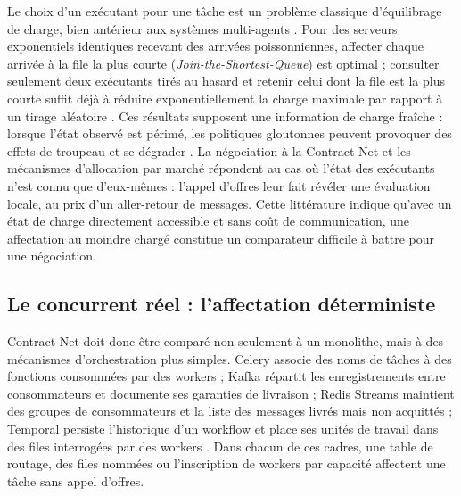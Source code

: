 Le choix d'un exécutant pour une tâche est un problème classique d'équilibrage de charge, bien antérieur aux systèmes multi-agents \cite{jiang2016survey}. Pour des serveurs exponentiels identiques recevant des arrivées poissonniennes, affecter chaque arrivée à la file la plus courte (\textit{Join-the-Shortest-Queue}) est optimal \cite{winston1977shortest} ; consulter seulement deux exécutants tirés au hasard et retenir celui dont la file est la plus courte suffit déjà à réduire exponentiellement la charge maximale par rapport à un tirage aléatoire \cite{azar1999balanced,mitzenmacher2001power}. Ces résultats supposent une information de charge fraîche : lorsque l'état observé est périmé, les politiques gloutonnes peuvent provoquer des effets de troupeau et se dégrader \cite{mitzenmacher2000old}. La négociation à la Contract Net et les mécanismes d'allocation par marché \cite{dias2006market} répondent au cas où l'état des exécutants n'est connu que d'eux-mêmes : l'appel d'offres leur fait révéler une évaluation locale, au prix d'un aller-retour de messages. Cette littérature indique qu'avec un état de charge directement accessible et sans coût de communication, une affectation au moindre chargé constitue un comparateur difficile à battre pour une négociation.

\subsection{Le concurrent réel : l'affectation déterministe}

Contract Net doit donc être comparé non seulement à un monolithe, mais à des mécanismes d'orchestration plus simples. Celery associe des noms de tâches à des fonctions consommées par des workers ; Kafka répartit les enregistrements entre consommateurs et documente ses garanties de livraison ; Redis Streams maintient des groupes de consommateurs et la liste des messages livrés mais non acquittés ; Temporal persiste l'historique d'un workflow et place ses unités de travail dans des files interrogées par des workers \cite{celery2026tasks,kafka2026semantics,redis2026streams,temporal2026tasks}. Dans chacun de ces cadres, une table de routage, des files nommées ou l'inscription de workers par capacité affectent une tâche sans appel d'offres.

